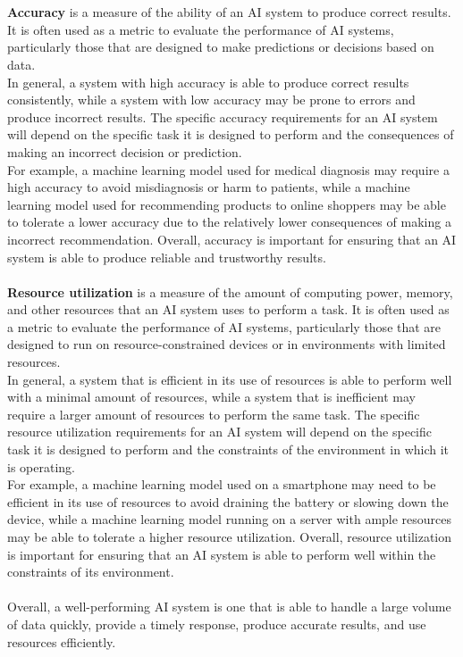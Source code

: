 \\
\\
\textbf{Accuracy} is a measure of the ability of an AI system to produce correct results.
It is often used as a metric to evaluate the performance of AI systems, particularly
those that are designed to make predictions or decisions based on data.
\\
In general, a system with high accuracy is able to produce correct results consistently,
while a system with low accuracy may be prone to errors and produce incorrect results.
The specific accuracy requirements for an AI system will depend on the specific task it is
designed to perform and the consequences of making an incorrect decision or prediction.
\\
For example, a machine learning model used for medical diagnosis may require a
high accuracy to avoid misdiagnosis or harm to patients, while a machine learning model
used for recommending products to online shoppers may be able to tolerate a lower accuracy due to
the relatively lower consequences of making a incorrect recommendation. Overall, accuracy is important for 
ensuring that an AI system is able to produce reliable and trustworthy results.
\\
\\
\textbf{Resource utilization} is a measure of the amount of computing power, memory, and other 
resources that an AI system uses to perform a task.
It is often used as a metric to evaluate the performance of AI systems, particularly those that 
are designed to run on resource-constrained devices or in environments with limited resources.
\\
In general, a system that is efficient in its use of resources is able to perform well with a 
minimal amount of resources, while a system that is inefficient may require a larger amount of 
resources to perform the same task. The specific resource utilization requirements for an AI system 
will depend on the specific task it is designed to perform and the constraints of the environment 
in which it is operating.
\\
For example, a machine learning model used on a smartphone may need to be efficient in its use of 
resources to avoid draining the battery or slowing down the device, while a machine learning model 
running on a server with ample resources may be able to tolerate a higher resource utilization. 
Overall, resource utilization is important for ensuring that an AI system is able to perform well within 
the constraints of its environment.
\\
\\
Overall, a well-performing AI system is one that is able to handle a 
large volume of data quickly, provide a timely response, produce accurate 
results, and use resources efficiently.

